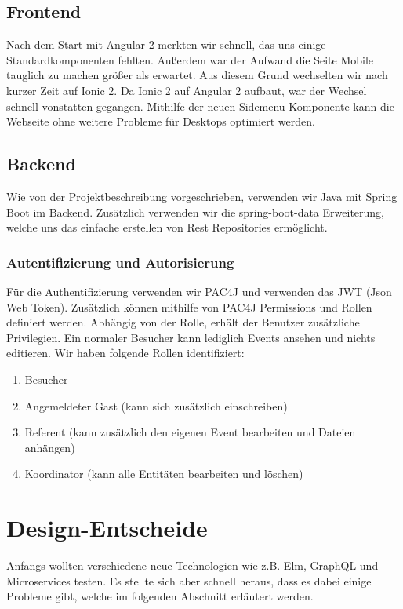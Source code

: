 \documentclass[11pt]{article} %
\begin{document}
\subsection{Frontend}
Nach dem Start mit Angular 2 merkten wir schnell, das uns einige Standardkomponenten fehlten. Außerdem war der Aufwand die Seite Mobile tauglich zu machen größer als erwartet. Aus diesem Grund wechselten wir nach kurzer Zeit auf Ionic 2. Da Ionic 2 auf Angular 2 aufbaut, war der Wechsel schnell vonstatten gegangen. Mithilfe der neuen Sidemenu Komponente kann die Webseite ohne weitere Probleme für Desktops optimiert werden.

\subsection{Backend}
Wie von der Projektbeschreibung vorgeschrieben, verwenden wir Java mit Spring Boot im Backend. Zusätzlich verwenden wir die spring-boot-data Erweiterung, welche uns das einfache erstellen von Rest Repositories ermöglicht. 

\subsubsection{Autentifizierung und Autorisierung}
Für die Authentifizierung verwenden wir PAC4J und verwenden das JWT (Json Web Token). Zusätzlich können mithilfe von PAC4J Permissions und Rollen definiert werden. Abhängig von der Rolle, erhält der Benutzer zusätzliche Privilegien. Ein normaler Besucher kann lediglich Events ansehen und nichts editieren. Wir haben folgende Rollen identifiziert:

\begin{enumerate}
\item Besucher
\item Angemeldeter Gast (kann sich zusätzlich einschreiben)
\item Referent (kann zusätzlich den eigenen Event bearbeiten und Dateien anhängen)
\item Koordinator (kann alle Entitäten bearbeiten und löschen)
\end{enumerate}

\newpage
\section{Design-Entscheide}
Anfangs wollten verschiedene neue Technologien wie z.B. Elm, GraphQL und Microservices testen. Es stellte sich aber schnell heraus, dass es dabei einige Probleme gibt, welche im folgenden Abschnitt erläutert werden.
\end{document}
